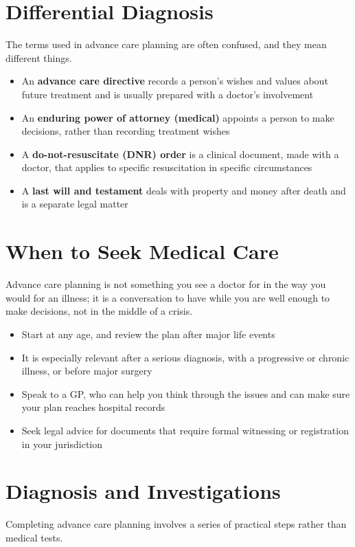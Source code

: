 \section*{Differential Diagnosis}
The terms used in advance care planning are often confused, and they mean different things.

\begin{itemize}
    \item An \textbf{advance care directive} records a person's wishes and values about future treatment and is usually prepared with a doctor's involvement
    \item An \textbf{enduring power of attorney (medical)} appoints a person to make decisions, rather than recording treatment wishes
    \item A \textbf{do-not-resuscitate (DNR) order} is a clinical document, made with a doctor, that applies to specific resuscitation in specific circumstances
    \item A \textbf{last will and testament} deals with property and money after death and is a separate legal matter
\end{itemize}

\section*{When to Seek Medical Care}
Advance care planning is not something you see a doctor for in the way you would for an illness; it is a conversation to have while you are well enough to make decisions, not in the middle of a crisis.

\begin{itemize}
    \item Start at any age, and review the plan after major life events
    \item It is especially relevant after a serious diagnosis, with a progressive or chronic illness, or before major surgery
    \item Speak to a GP, who can help you think through the issues and can make sure your plan reaches hospital records
    \item Seek legal advice for documents that require formal witnessing or registration in your jurisdiction
\end{itemize}

\section*{Diagnosis and Investigations}
Completing advance care planning involves a series of practical steps rather than medical tests.

